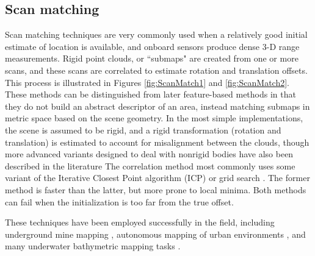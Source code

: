 \subsection{Scan matching}

Scan matching techniques are very commonly used when a relatively good initial estimate of location is available, and onboard sensors produce dense 3-D range measurements. Rigid point clouds, or ``submaps" are created from one or more scans, and these scans are correlated to estimate rotation and translation offsets. This process is illustrated in Figures \ref{fig:ScanMatch1} and \ref{fig:ScanMatch2}. These methods can be distinguished from later feature-based methods in that they do not build an abstract descriptor of an area, instead matching submaps in metric space based on the scene geometry. In the most simple implementations, the scene is assumed to be rigid, and a rigid transformation (rotation and translation) is estimated to account for misalignment between the clouds, though more advanced variants designed to deal with nonrigid bodies have also been described in the literature \cite{Amberg2007, Feldmar1996,Haehnel2003} The correlation method most commonly uses some variant of the Iterative Closest Point algorithm (ICP) \cite{Besl1992} or grid search \cite{Miller2013}. The former method is faster than the latter, but more prone to local minima. Both methods can fail when the initialization is too far from the true offset. 

These techniques have been employed successfully in the field, including underground mine mapping \cite{Bosse2003}, autonomous mapping of urban environments \cite{Thrun2006}, and many underwater bathymetric mapping tasks \cite{Caress2008}.

